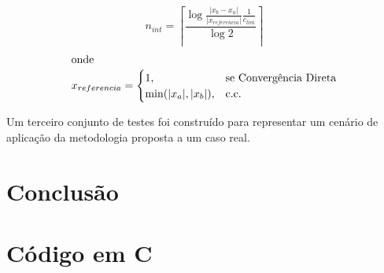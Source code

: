 \documentclass[final,3p,12pt]{elsarticle}
\begin{document}
    \begin{equation} \label{eq:nint}
        n_{int} = \left \lceil \frac{\log{\frac{|x_b-x_a|}{|x_{referencia}|}\frac{1}{c_{lim}}}}{\log{2}} \right \rceil
    \end{equation}
    \begin{align*}
    \intertext{onde}
    x_{referencia} = \begin{cases}
        1,&\text{se Convergência Direta} \\
        \min(|x_a|,|x_b|),&\text{c.c. }  
    \end{cases}
    \end{align*}

    Um terceiro conjunto de testes foi construído para representar um cenário de aplicação da metodologia proposta a um caso real.
        
    
    
    \section{Conclusão}
    
    



 







\appendix

\section{Código em C}

% 
\end{document}
